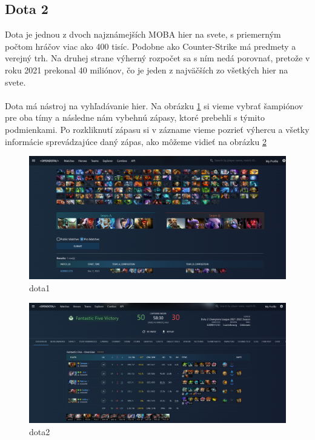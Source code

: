 \subsection{Dota 2}
Dota je jednou z dvoch najznámejších MOBA hier na svete, s priemerným počtom hráčov viac ako 400 tisíc. \cite{dotaplayers} Podobne ako Counter-Strike má predmety a verejný trh. Na druhej strane výherný rozpočet sa s ním nedá porovnať, pretože v roku 2021 prekonal 40 miliónov, čo je jeden z najväčších zo všetkých hier na svete. \cite{dotaprizepool}
\\ \\
Dota má nástroj na vyhľadávanie hier. Na obrázku \ref{dota1} si vieme vybrať šampiónov pre oba tímy a následne nám vybehnú zápasy, ktoré prebehli s týmito podmienkami.
Po rozkliknutí zápasu si v zázname vieme pozrieť výhercu a všetky informácie sprevádzajúce daný zápas, ako môžeme vidieť na obrázku \ref{dota2}
 \begin{figure}[h!]
	\includegraphics[width=.9\textwidth]{figures/dota1}
	\centering
	\caption{ dota1 \label{dota1}}
	
\end{figure}


 \begin{figure}[h!]
	
	\includegraphics[width=.9\textwidth]{figures/dota2}
	\centering
	\caption{ dota2 \label{dota2}}
	
\end{figure}

